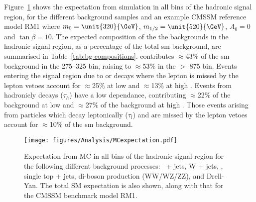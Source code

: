 Figure~\ref{fig:figures_Analysis_MCexpectation}\cite{CMS-AN-11-517} shows the 
expectation from simulation in all bins of the hadronic signal region, for the 
different background samples and an example CMSSM reference model RM1 where $m_0=\unit{320}{\GeV}$, $m_{1/2}=\unit{520}{\GeV}$, $A_0=0$ and $\tan\beta=10$. 
The expected composition of the the backgrounds in the hadronic signal region, 
as a percentage of the total \ac{sm} background, are summarised in 
Table~\ref{tab:bg-compositions}. \HepProcess{\PZ\to\nu\nu} contributes 
$\approx$43$\%$ of the \ac{sm} background in the 
\unit{275}{\GeV}--\unit{325}{\GeV} \HT bin, raising to $\approx$53$\%$ in the 
\HT $>$ \unit{875}{\GeV} bin. Events entering the signal region due to \PZ or 
\PW decays where the lepton is missed by the lepton vetoes account for 
$\approx$25$\%$ at low \HT and $\approx$13$\%$ at high \HT. Events from 
hadronicly decays \Ptau ($\tau_{h}$) have a low \HT dependance, contributing 
$\approx$22$\%$ of the background at low \HT and $\approx$27$\%$ of the 
background at high \HT. Those events arising from \Ptau particles which decay leptonically ($\tau_{l}$) and are missed by the lepton vetoes account for $\approx$10$\%$ of the \ac{sm} background.

\begin{figure}[ht|]
  \centering
    \texttt{[image: figures/Analysis/MCexpectation.pdf]}
  \caption{Expectation from MC in all bins of the hadronic signal
      region for the following different background processes: \HepProcess{\PZ\to\nu\nu}\
      + jets, W + jets, \HepProcess{\Ptop\APtop}, single top + jets, di-boson production
      (WW/WZ/ZZ), and Drell-Yan. The total SM expectation is also
      shown, along with that for the CMSSM benchmark model RM1.}
  \label{fig:figures_Analysis_MCexpectation}
\end{figure}

